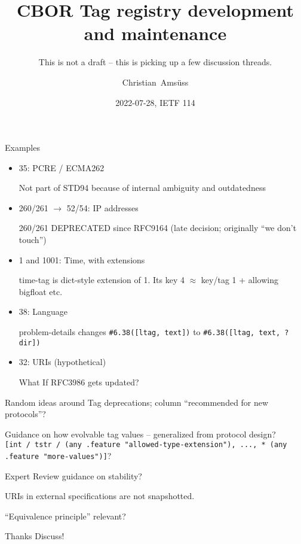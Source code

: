 \documentclass[aspectratio=169,colorlinks]{beamer}
\title{CBOR Tag registry development and maintenance}
\subtitle{This is not a draft -- this is picking up a few discussion threads.}
\author{Christian~Amsüss}
\date{2022-07-28, IETF 114}
\begin{document}
\frame{\titlepage}

\begin{frame}{Examples}\large
    \begin{itemize}
        \item 35: PCRE / ECMA262

            Not part of STD94 because of internal ambiguity and outdatedness

        \item 260/261 $\to$ 52/54: IP addresses

            260/261 DEPRECATED since RFC9164 (late decision; originally ``we don't touch'')

        \item 1 and 1001: Time, with extensions

            time-tag is dict-style extension of 1. Its key 4 $\approx$ key/tag 1 + allowing bigfloat etc.

        \item 38: Language

            problem-details changes \texttt{\#6.38([ltag, text])} to  \texttt{\#6.38([ltag, text, ?dir])}

        \item 32: URIs (hypothetical)

            What If RFC3986 gets updated?
    \end{itemize}
\end{frame}

\begin{frame}{Random ideas around}\Large
    Tag deprecations; column ``recommended for new protocols''?

    \bigskip

    Guidance on how evolvable tag values -- generalized from protocol design?\\
    \texttt{[int / tstr / (any .feature "allowed-type-extension"), ..., * (any .feature "more-values")]}?

    \bigskip

    Expert Review guidance on stability?

    \bigskip

    URIs in external specifications are not snapshotted.

    \bigskip

    ``Equivalence principle'' relevant?
\end{frame}

\begin{frame}{Thanks}\Large
    Discuss!
\end{frame}
\end{document}
